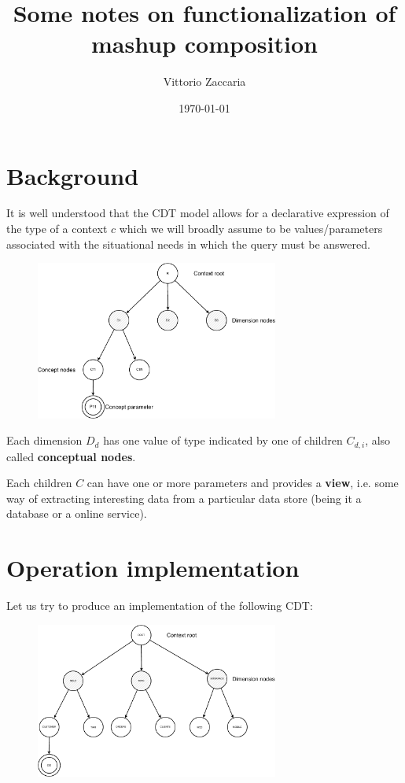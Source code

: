 \documentclass[12pt,a4]{article}
\author{Vittorio Zaccaria}
\date{\today}
\title{Some notes on functionalization of mashup composition}
\begin{document}
\maketitle
\tableofcontents

\newpage

\section{Background}
\label{sec:orgheadline1}

It is well understood that the CDT model allows for a declarative expression of
the type of a context \(c\) which we will broadly assume to be values/parameters
associated with the situational needs in which the query must be answered.

\vspace{0.25cm}
\begin{figure}[htb]
\centering
\includegraphics[width=8cm]{./key/page-1-crop.pdf}
\end{figure}
\vspace{0.25cm}

Each dimension \(D_d\) has one value of type indicated by one of children
\(C_{d,i}\), also called \textbf{conceptual nodes}. 

Each children \(C\) can have one or more parameters and provides a \textbf{view}, i.e. some way of
extracting interesting data from a particular data store (being it a database or
a online service). 

\newpage

\section{Operation implementation}
\label{sec:orgheadline5}

Let us try to produce an implementation of the following CDT:

\vspace{0.25cm}
\begin{figure}[htb]
\centering
\includegraphics[width=8cm]{./key/page-2-crop.pdf}
\end{figure}
\vspace{0.25cm}
\end{document}
